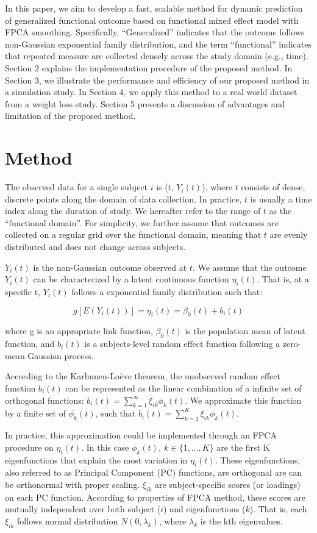 \documentclass[
  11pt,
]{article}
\begin{document}
In this paper, we aim to develop a fast, scalable method for dynamic
prediction of generalized functional outcome based on functional mixed
effect model with FPCA smoothing. Specifically, ``Generalized''
indicates that the outcome follows non-Gaussian exponential family
distribution, and the term ``functional'' indicates that repeated
measure are collected densely across the study domain (e.g., time).
Section 2 explains the implementation procedure of the proposed method.
In Section 3, we illustrate the performance and efficiency of our
proposed method in a simulation study. In Section 4, we apply this
method to a real world dataset from a weight loss study. Section 5
presents a discussion of advantages and limitation of the proposed
method.

\hypertarget{method}{%
\section{Method}\label{method}}

The observed data for a single subject \(i\) is (\(t\), \(Y_i(t)\)),
where \(t\) consists of dense, discrete points along the domain of data
collection. In practice, \(t\) is usually a time index along the
duration of study. We hereafter refer to the range of \(t\) as the
``functional domain''. For simplicity, we further assume that outcomes
are collected on a regular grid over the functional domain, meaning that
\(t\) are evenly distributed and does not change across subjects.

\(Y_i(t)\) is the non-Gaussian outcome observed at \(t\). We assume that
the outcome \(Y_i(t)\) can be characterized by a latent continuous
function \(\eta_i(t)\). That is, at a specific t, \(Y_i(t)\) follows a
exponential family distribution such that:

\[
g[E(Y_i(t))] = \eta_i(t) = \beta_0(t)+b_i(t)
\]

where g is an appropriate link function, \(\beta_0(t)\) is the
population mean of latent function, and \(b_i(t)\) is a subjects-level
random effect function following a zero-mean Gaussian process.

According to the Karhunen-Loève theorem, the unobserved random effect
function \(b_i(t)\) can be represented as the linear combination of a
infinite set of orthogonal functions:
\(b_i(t)=\sum_{k=1}^{\infty}\xi_{ik}\phi_{k}(t)\). We approximate this
function by a finite set of \(\phi_{k}(t)\), such that
\(b_i(t)=\sum_{k=1}^{K}\xi_{ik}\phi_{k}(t)\).

In practice, this approximation could be implemented through an FPCA
procedure on \(\eta_i(t)\). In this case
\(\phi_{k}(t),\ k \in \{1,...,K\}\) are the first K eigenfunctions that
explain the most variation in \(\eta_i(t)\). These eigenfunctions, also
referred to as Principal Component (PC) functions, are orthogonal are
can be orthonormal with proper scaling. \(\xi_{ik}\) are
subject-specific scores (or loadings) on each PC function. According to
properties of FPCA method, these scores are mutually independent over
both subject (\(i\)) and eigenfunctions (\(k\)). That is, each
\(\xi_{ik}\) follows normal distribution \(N(0, \lambda_k)\), where
\(\lambda_k\) is the kth eigenvalues.
\end{document}
